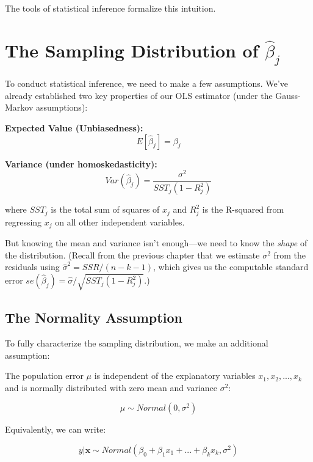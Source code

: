 \documentclass[
  letterpaper,
  DIV=11,
  numbers=noendperiod]{scrreprt}
\begin{document}
The tools of statistical inference formalize this intuition.

\section{\texorpdfstring{The Sampling Distribution of
\(\hat{\beta}_j\)}{The Sampling Distribution of \textbackslash hat\{\textbackslash beta\}\_j}}\label{the-sampling-distribution-of-hatbeta_j}

To conduct statistical inference, we need to make a few assumptions.
We've already established two key properties of our OLS estimator (under
the Gauss-Markov assumptions):

\textbf{Expected Value (Unbiasedness):} \[E[\hat{\beta}_j] = \beta_j\]

\textbf{Variance (under homoskedasticity):}
\[Var(\hat{\beta}_j) = \frac{\sigma^2}{SST_j(1 - R^2_j)}\]

where \(SST_j\) is the total sum of squares of \(x_j\) and \(R^2_j\) is
the R-squared from regressing \(x_j\) on all other independent
variables.

But knowing the mean and variance isn't enough---we need to know the
\emph{shape} of the distribution. (Recall from the previous chapter that
we estimate \(\sigma^2\) from the residuals using
\(\hat{\sigma}^2 = SSR/(n-k-1)\), which gives us the computable standard
error \(se(\hat{\beta}_j) = \hat{\sigma}/\sqrt{SST_j(1 - R_j^2)}\).)

\subsection{The Normality Assumption}\label{the-normality-assumption}

To fully characterize the sampling distribution, we make an additional
assumption:

\begin{tcolorbox}[enhanced jigsaw, arc=.35mm, bottomrule=.15mm, bottomtitle=1mm, breakable, colback=white, colbacktitle=quarto-callout-important-color!10!white, colframe=quarto-callout-important-color-frame, coltitle=black, left=2mm, leftrule=.75mm, opacityback=0, opacitybacktitle=0.6, rightrule=.15mm, title=\textcolor{quarto-callout-important-color}{\faExclamation}\hspace{0.5em}{Normality Assumption}, titlerule=0mm, toprule=.15mm, toptitle=1mm]

The population error \(\mu\) is independent of the explanatory variables
\(x_1, x_2, ..., x_k\) and is normally distributed with zero mean and
variance \(\sigma^2\):

\[\mu \sim Normal(0, \sigma^2)\]

Equivalently, we can write:

\[y | \mathbf{x} \sim Normal(\beta_0 + \beta_1 x_1 + ... + \beta_k x_k, \sigma^2)\]

\end{tcolorbox}
\end{document}
